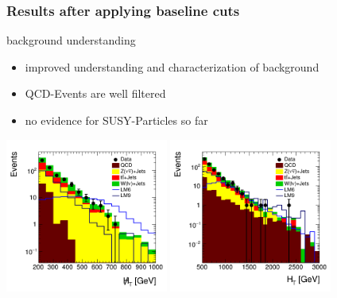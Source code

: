 \begin{frame}
	\frametitle{Results after applying baseline cuts}
	\begin{block}{background understanding}
		\begin{itemize}
			\item improved understanding and characterization of background 
			\item QCD-Events are well filtered
			\item no evidence for SUSY-Particles so far
		\end{itemize}
	\end{block}
	
	\begin{center}
		\includegraphics[width = 0.4\textwidth]{plots10/hDataVsMC_Mht.png}
		\includegraphics[width = 0.4\textwidth]{plots10/hDataVsMC_Ht.png}
	\end{center}

\end{frame}